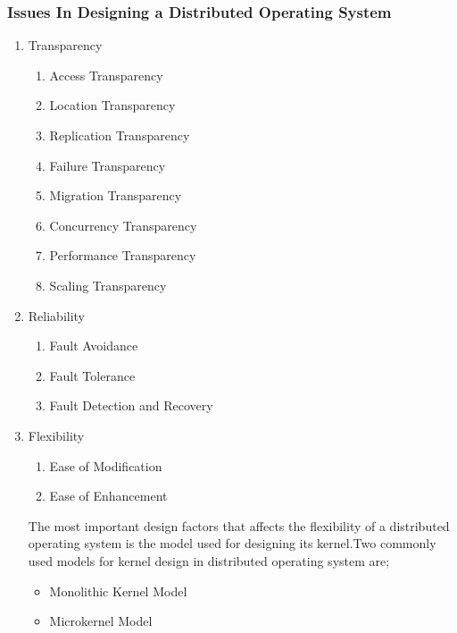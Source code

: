 \documentclass{beamer}
\begin{document}
\begin{frame}[allowframebreaks]
    \frametitle{Issues In Designing a Distributed Operating System}
    \begin{enumerate}
      	\item {Transparency
      	\begin{enumerate}
      		\item Access Transparency
        	\item Location Transparency
        	\item Replication Transparency
        	\item Failure Transparency
        	\item Migration Transparency
        	\item Concurrency Transparency
        	\item Performance Transparency
        	\item Scaling Transparency
      	\end{enumerate}}
      	\vspace{4cm}
      	\framebreak
      	\item {Reliability
      	\begin{enumerate}
      		\item Fault Avoidance
      		\item Fault Tolerance
      		\item Fault Detection and Recovery
      	\end{enumerate}}
      	\vspace{6cm}
      	\framebreak
      	\item {Flexibility
      	\begin{enumerate}
      		\item Ease of Modification
      		\item Ease of Enhancement
      	\end{enumerate}}
      	\vspace{1cm}
      	The most important design factors that affects the flexibility of a distributed operating system is the model used for designing its kernel.Two commonly used models for kernel design in distributed operating system are;
      	\vspace{0.5cm}
      	\begin{itemize}
      		\item Monolithic Kernel Model
      		\item Microkernel Model
      	\end{itemize}
      	\vspace{6cm}

\end{enumerate}
\end{frame}
\end{document}

